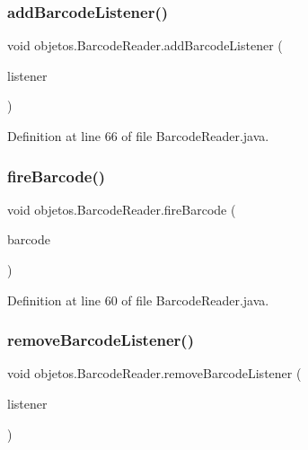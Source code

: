 \subsubsection{\texorpdfstring{add\+Barcode\+Listener()}{addBarcodeListener()}}
{\footnotesize\ttfamily void objetos.\+Barcode\+Reader.\+add\+Barcode\+Listener (\begin{DoxyParamCaption}\item[{\mbox{\hyperlink{interfaceobjetos_1_1_barcode_reader_1_1_barcode_listener}{Barcode\+Listener}}}]{listener }\end{DoxyParamCaption})}



Definition at line 66 of file Barcode\+Reader.\+java.

\mbox{\label{classobjetos_1_1_barcode_reader_a1cd53567cad388b796e540c7a9240bf7}} 
\subsubsection{\texorpdfstring{fire\+Barcode()}{fireBarcode()}}
{\footnotesize\ttfamily void objetos.\+Barcode\+Reader.\+fire\+Barcode (\begin{DoxyParamCaption}\item[{String}]{barcode }\end{DoxyParamCaption})\hspace{0.3cm}{\ttfamily [protected]}}



Definition at line 60 of file Barcode\+Reader.\+java.

\mbox{\label{classobjetos_1_1_barcode_reader_a4b49668d25796160e591b78b89b287eb}} 
\subsubsection{\texorpdfstring{remove\+Barcode\+Listener()}{removeBarcodeListener()}}
{\footnotesize\ttfamily void objetos.\+Barcode\+Reader.\+remove\+Barcode\+Listener (\begin{DoxyParamCaption}\item[{\mbox{\hyperlink{interfaceobjetos_1_1_barcode_reader_1_1_barcode_listener}{Barcode\+Listener}}}]{listener }\end{DoxyParamCaption})}



